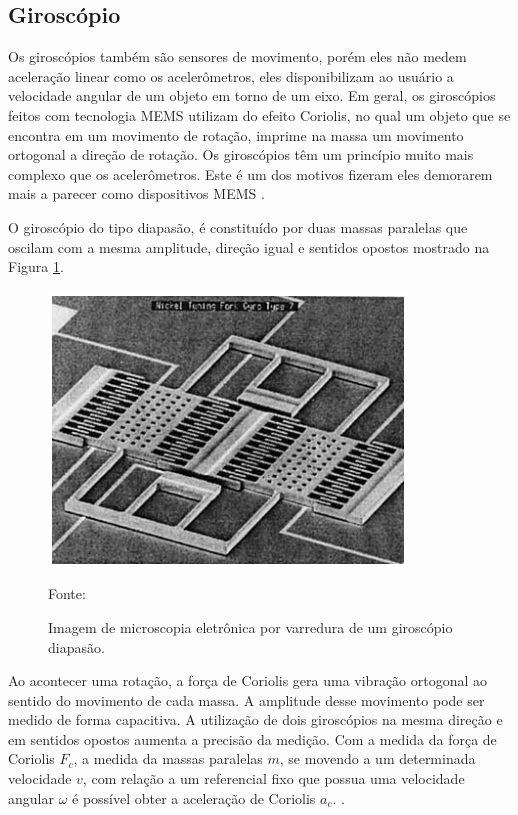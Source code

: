 		\subsection{Giroscópio}
			
			Os giroscópios também são sensores de movimento, porém eles não medem aceleração linear como os acelerômetros, eles disponibilizam ao usuário a velocidade angular de um objeto em torno de um eixo. Em geral, os giroscópios feitos com tecnologia MEMS utilizam do efeito Coriolis, no qual um objeto que se encontra em um movimento de rotação, imprime na massa um movimento ortogonal a direção de rotação. Os giroscópios têm um princípio muito mais complexo que os acelerômetros. Este é um dos motivos fizeram eles demorarem mais a parecer como dispositivos MEMS \cite{almeida2014}.
			
			O giroscópio do tipo diapasão, é constituído por duas massas paralelas que oscilam com a mesma amplitude, direção igual e sentidos opostos mostrado na Figura \ref{gyro}.
			
			\begin{figure}[h]
				\centering
				\includegraphics[keepaspectratio=true,scale=0.7
				]{figuras/diapasao.png}
				\caption{ Imagem de microscopia eletrônica por varredura de um giroscópio diapasão.}
				Fonte: \cite{forhan2010}
				\label{gyro}	
			\end{figure}
			
			Ao acontecer uma rotação, a força de Coriolis gera uma vibração ortogonal ao sentido do movimento de cada massa. A amplitude desse movimento pode ser medido de forma capacitiva. A utilização de dois giroscópios na mesma direção e em sentidos opostos aumenta a precisão da medição. Com a medida da força de Coriolis  $F_{c}$, a medida da massas paralelas $m$, se movendo a um determinada velocidade $v$, com relação a um referencial fixo que possua uma velocidade angular $ \omega $ é possível obter a aceleração de Coriolis $a_{c}$. \cite{forhan2010}.
			
